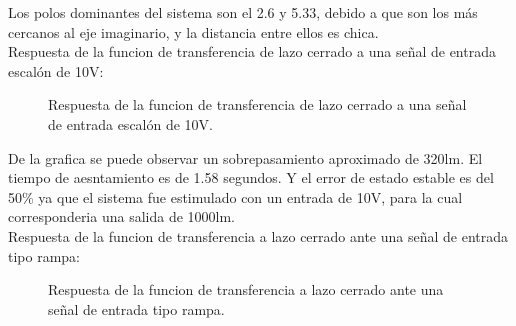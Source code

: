 \documentclass[a4paper,11pt]{article}
\begin{document}
Los polos dominantes del sistema son el 2.6 y 5.33, debido a que son los más cercanos al eje imaginario, y la distancia entre ellos es chica.\\
Respuesta de la funcion de transferencia de lazo cerrado a una señal de entrada escalón de 10V:

  \begin{figure}[H] %
	\caption{Respuesta de la funcion de transferencia de lazo cerrado a una señal de entrada escalón de 10V.}
	\label{fig:resp_esc2}
	\end{figure} 

De la grafica se puede observar un sobrepasamiento aproximado de 320lm. El tiempo de aesntamiento es de 1.58 segundos. Y el error de estado estable es del 50\% ya que el sistema fue estimulado con un entrada de 10V, para la cual corresponderia una salida de 1000lm.\\
Respuesta de la funcion de transferencia a lazo cerrado ante una señal de entrada tipo rampa:

  \begin{figure}[H] %
	\caption{Respuesta de la funcion de transferencia a lazo cerrado ante una señal de entrada tipo rampa.}
	\label{fig:resp_rampa1}
	\end{figure} 
\end{document}
